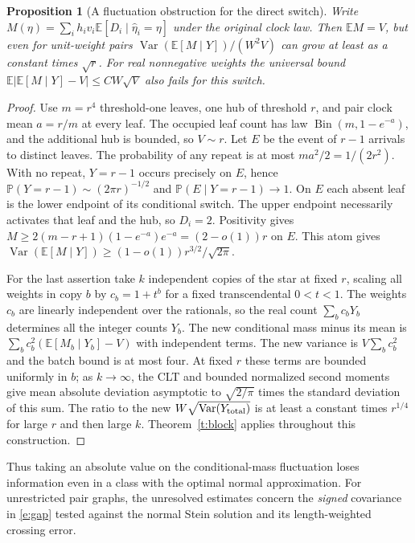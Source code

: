 \documentclass[11pt]{article}
\newtheorem{prop}[theorem]{Proposition}
\newcommand{\E}{\mathbb E}
\newcommand{\Prb}{\mathbb P}
\newcommand{\Var}{\operatorname{Var}}
\numberwithin{equation}{section}
\begin{document}
\begin{prop}[A fluctuation obstruction for the direct switch]\label{p:obstruct}
Write $M(\eta)=\sum_i h_i v_i\E[D_i\mid\widehat\eta_i=\eta]$ under the
original clock law. Then $\E M=V$, but even for unit-weight pairs
$\Var(\E[M\mid Y])/(W^2 V)$ can grow at least as a constant times $\sqrt r$.
For real nonnegative weights the universal bound
$\E|\E[M\mid Y]-V|\le CW\sqrt V$ also fails for this switch.
\end{prop}
\begin{proof}
Use $m=r^4$ threshold-one leaves, one hub of threshold $r$, and pair clock
mean $a=r/m$ at every leaf. The occupied leaf count has law
$\operatorname{Bin}(m,1-e^{-a})$, and the additional hub is bounded, so $V\sim r$.
Let $E$ be the event of $r-1$ arrivals to distinct leaves. The probability of any
repeat is at most $ma^2/2=1/(2r^2)$. With no repeat, $Y=r-1$ occurs precisely on
$E$, hence $\Prb(Y=r-1)\sim(2\pi r)^{-1/2}$ and $\Prb(E\mid Y=r-1)\to1$.
On $E$ each absent leaf is the lower endpoint of its conditional switch. The
upper endpoint necessarily activates that leaf and the hub, so $D_i=2$.
Positivity gives $M\ge2(m-r+1)(1-e^{-a})e^{-a}=(2-o(1))r$ on $E$.
This atom gives $\Var(\E[M\mid Y])\ge(1-o(1))r^{3/2}/\sqrt{2\pi}$.

For the last assertion take $k$ independent copies of the star at fixed $r$, scaling
all weights in copy $b$ by $c_b=1+t^b$ for a fixed transcendental $0<t<1$.
The weights $c_b$ are linearly independent over the rationals, so the real count
$\sum_b c_bY_b$ determines all the integer counts $Y_b$. The new conditional
mass minus its mean is $\sum_b c_b^2(\E[M_b\mid Y_b]-V)$ with independent terms.
The new variance is $V\sum_b c_b^2$ and the batch bound is at most four. At fixed $r$
these terms are bounded uniformly in $b$; as $k\to\infty$, the CLT and bounded
normalized second moments give mean absolute deviation asymptotic to $\sqrt{2/\pi}$
times the standard deviation of this sum. The ratio to the new $W\sqrt{\Var(Y_{\rm total})}$
is at least a constant times $r^{1/4}$ for large $r$ and then large $k$.
Theorem~\ref{t:block} applies throughout this construction.
\end{proof}
Thus taking an absolute value on the conditional-mass fluctuation loses information
even in a class with the optimal normal approximation. For unrestricted pair graphs,
the unresolved estimates concern the \emph{signed} covariance in \eqref{e:gap}
tested against the normal Stein solution and its length-weighted crossing error.
\end{document}
